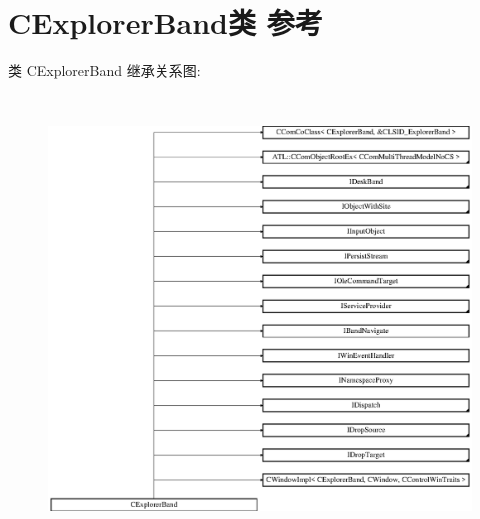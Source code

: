 \hypertarget{class_c_explorer_band}{}\section{C\+Explorer\+Band类 参考}
\label{class_c_explorer_band}
类 C\+Explorer\+Band 继承关系图\+:\begin{figure}[H]
\begin{center}
\leavevmode
\includegraphics[height=11.851852cm]{class_c_explorer_band}
\end{center}
\end{figure}
